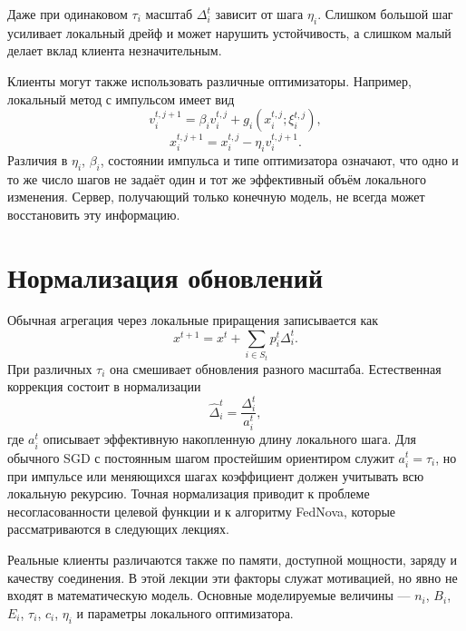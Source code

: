 Даже при одинаковом \(\tau_i\) масштаб \(\Delta_i^t\) зависит от
шага \(\eta_i\). Слишком большой шаг усиливает локальный дрейф и
может нарушить устойчивость, а слишком малый делает вклад клиента
незначительным.

Клиенты могут также использовать различные оптимизаторы. Например,
локальный метод с импульсом имеет вид
\[
    v_i^{t,j+1}
    =
    \beta_i v_i^{t,j}
    +
    g_i
    \left(
        x_i^{t,j};\xi_i^{t,j}
    \right),
\]
\[
    x_i^{t,j+1}
    =
    x_i^{t,j}
    -
    \eta_i v_i^{t,j+1}.
\]
Различия в \(\eta_i\), \(\beta_i\), состоянии импульса и типе
оптимизатора означают, что одно и то же число шагов не задаёт один и
тот же эффективный объём локального изменения. Сервер, получающий
только конечную модель, не всегда может восстановить эту информацию.

\section{Нормализация обновлений}

Обычная агрегация через локальные приращения записывается как
\[
    x^{t+1}
    =
    x^t
    +
    \sum_{i\in S_t}p_i^t\Delta_i^t.
\]
При различных \(\tau_i\) она смешивает обновления разного масштаба.
Естественная коррекция состоит в нормализации
\[
    \widehat\Delta_i^t
    =
    \frac{\Delta_i^t}{a_i^t},
\]
где \(a_i^t\) описывает эффективную накопленную длину локального
шага. Для обычного SGD с постоянным шагом простейшим ориентиром служит
\(a_i^t=\tau_i\), но при импульсе или меняющихся шагах коэффициент
должен учитывать всю локальную рекурсию. Точная нормализация приводит
к проблеме несогласованности целевой функции и к алгоритму FedNova,
которые рассматриваются в следующих лекциях.

Реальные клиенты различаются также по памяти, доступной мощности,
заряду и качеству соединения. В этой лекции эти факторы служат
мотивацией, но явно не входят в математическую модель. Основные
моделируемые величины --- \(n_i\), \(B_i\), \(E_i\), \(\tau_i\),
\(c_i\), \(\eta_i\) и параметры локального оптимизатора.
